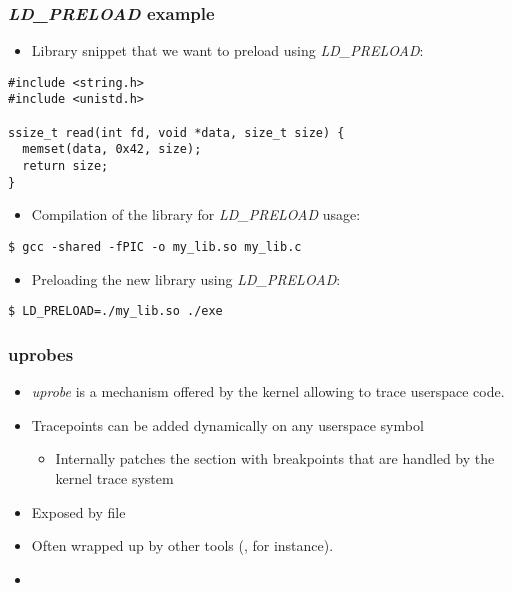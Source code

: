 \begin{frame}[fragile]
  \frametitle{{\em LD\_PRELOAD} example}
  \begin{itemize}
    \item Library snippet that we want to preload using {\em LD\_PRELOAD}:
  \end{itemize}
  \begin{block}{}
    \begin{verbatim}
#include <string.h>
#include <unistd.h>

ssize_t read(int fd, void *data, size_t size) {
  memset(data, 0x42, size);
  return size;
}
    \end{verbatim}
  \end{block}
  \begin{itemize}
    \item Compilation of the library for {\em LD\_PRELOAD} usage:
  \end{itemize}
  \begin{block}{}
    \begin{verbatim}
$ gcc -shared -fPIC -o my_lib.so my_lib.c
    \end{verbatim}
  \end{block}

  \begin{itemize}
    \item Preloading the new library using {\em LD\_PRELOAD}:
  \end{itemize}
  \begin{block}{}
    \begin{verbatim}
$ LD_PRELOAD=./my_lib.so ./exe
    \end{verbatim}
  \end{block}
\end{frame}

\begin{frame}[fragile]
  \frametitle{uprobes}
  \begin{itemize}
    \item {\em uprobe} is a mechanism offered by the kernel allowing to trace
          userspace code.
    \item Tracepoints can be added dynamically on any userspace symbol
    \begin{itemize}
      \item Internally patches the  section with breakpoints
        that are handled by the kernel trace system
    \end{itemize}
    \item Exposed by file 
    \item Often wrapped up by other tools (,  for
          instance).
    \item {}
  \end{itemize}
\end{frame}

